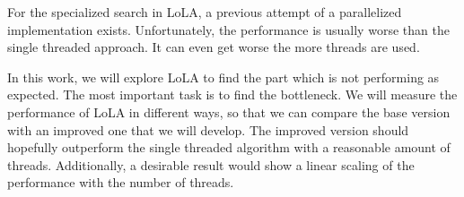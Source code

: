 For the specialized search in LoLA, a previous attempt of a parallelized implementation exists. Unfortunately, the performance is usually worse than the single threaded approach. It can even get worse the more threads are used.

In this work, we will explore LoLA to find the part which is not performing as expected. The most important task is to find the bottleneck. We will measure the performance of LoLA in different ways, so that we can compare the base version with an improved one that we will develop. The improved version should hopefully outperform the single threaded algorithm with a reasonable amount of threads. Additionally, a desirable result would show a linear scaling of the performance with the number of threads.
